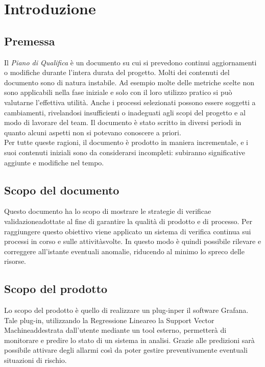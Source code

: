 \section{Introduzione}
\subsection{Premessa}
Il \textit{Piano di Qualifica} è un documento su cui si prevedono continui aggiornamenti o modifiche durante l'intera durata del progetto. Molti dei contenuti del documento sono di natura instabile. Ad esempio molte delle metriche scelte non sono applicabili nella fase iniziale e solo con il loro utilizzo pratico si può valutarne l'effettiva utilità. Anche i processi selezionati possono essere soggetti a cambiamenti, rivelandosi insufficienti o inadeguati agli scopi del progetto e al modo di lavorare del team. Il documento è stato scritto in diversi periodi in quanto alcuni aspetti non si potevano conoscere a priori. \\
Per tutte queste ragioni, il documento è prodotto in maniera incrementale\glo, e i suoi contenuti iniziali sono da considerarsi incompleti: subiranno significative aggiunte e modifiche nel tempo.

\subsection{Scopo del documento}
Questo documento ha lo scopo di mostrare le strategie di verifica\glo e validazione\glo adottate al fine di garantire la qualità di prodotto e di processo\glo. Per raggiungere questo obiettivo viene applicato un sistema di verifica continua sui processi in corso e sulle attività\glo svolte. In questo modo è quindi possibile rilevare e correggere all'istante eventuali anomalie, riducendo al minimo lo spreco delle risorse.

\subsection{Scopo del prodotto}
Lo scopo del prodotto è quello di realizzare un plug-in\glo per il software Grafana\glo. Tale plug-in, utilizzando la Regressione Lineare\glo o la Support Vector Machine\glo addestrata dall'utente mediante un tool esterno, permetterà di monitorare e predire lo stato di un sistema in analisi. Grazie alle predizioni sarà possibile attivare degli allarmi così da poter gestire preventivamente eventuali situazioni di rischio. \\



